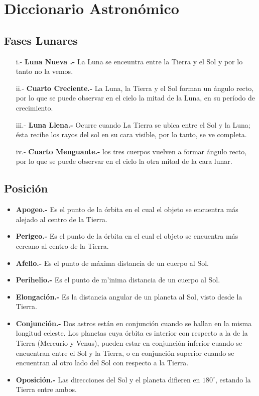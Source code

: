 \documentclass[12pt,a4paper,oneside]{article}
\begin{document}
\section{Diccionario Astron\'omico}

\subsection{Fases Lunares}
\begin{itemize}
\item [i.-]\textbf{Luna Nueva .-} La Luna se enceuntra entre la Tierra y el Sol y por lo tanto no la vemos.

\item[ii.-]\textbf{Cuarto Creciente.-} La Luna, la Tierra y el Sol forman un \'angulo recto, por lo que se puede observar en el cielo la mitad de la Luna, en su per\'iodo de crecimiento.

\item[iii.-]\textbf{Luna Llena.-} Ocurre cuando La Tierra se ubica entre el Sol y la Luna; \'esta recibe los rayos del sol en su cara visible, por lo tanto, se ve completa.
\item [iv.-]\textbf{ Cuarto Menguante.-} los tres cuerpos vuelven a formar \'angulo recto, por lo que se puede observar en el cielo la otra mitad de la cara lunar.

\end{itemize}
\subsection{Posici\'on}
\begin{itemize}
\item \textbf{Apogeo.-} Es el punto de la \'orbita en el cual el objeto se encuentra m\'as alejado al centro de la Tierra.
\item \textbf{Perigeo.-} Es el punto de la \'orbita en el cual el objeto se encuentra m\'as cercano al centro de la Tierra.
\item \textbf{Afelio.-} Es el punto de m\'axima distancia de un cuerpo al Sol.
\item \textbf{Perihelio.-} Es el punto de m'inima distancia de un cuerpo al Sol.
\item \textbf{Elongaci\'on.-} Es la distancia angular de un planeta al Sol, visto desde la Tierra.
\item \textbf{Conjunci\'on.-} Dos astros est\'an en conjunci\'on cuando se hallan en la misma longitud celeste. Los planetas cuya \'orbita es interior con respecto a la de la Tierra (Mercurio y Venus), pueden estar en conjunci\'on inferior cuando se encuentran entre el Sol y la Tierra, o en conjunci\'on superior cuando se encuentran al otro lado del Sol con respecto a la Tierra. 
\item \textbf{Oposici\'on.-} Las direcciones del Sol y el planeta difieren en $180^\circ$, estando la Tierra entre ambos.
\end{itemize}
\end{document}
